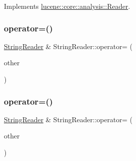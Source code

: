 Implements \mbox{\hyperlink{classlucene_1_1core_1_1analysis_1_1Reader_a230fae02ca4a63de33fdaad6f9aafd96}{lucene\+::core\+::analysis\+::\+Reader}}.

\mbox{\label{classlucene_1_1core_1_1analysis_1_1StringReader_ae79c2f5548c96bd451ebcb5a4f34ef0c}} 
\subsubsection{\texorpdfstring{operator=()}{operator=()}\hspace{0.1cm}{\footnotesize\ttfamily [1/4]}}
{\footnotesize\ttfamily \mbox{\hyperlink{classlucene_1_1core_1_1analysis_1_1StringReader}{String\+Reader}} \& String\+Reader\+::operator= (\begin{DoxyParamCaption}\item[{\mbox{\hyperlink{ZlibCrc32_8h_a2c212835823e3c54a8ab6d95c652660e}{const}} \mbox{\hyperlink{classlucene_1_1core_1_1analysis_1_1StringReader}{String\+Reader}} \&}]{other }\end{DoxyParamCaption})}

\mbox{\label{classlucene_1_1core_1_1analysis_1_1StringReader_a4ee9a9d9f36760e7d7a3495cb73efc70}} 
\subsubsection{\texorpdfstring{operator=()}{operator=()}\hspace{0.1cm}{\footnotesize\ttfamily [2/4]}}
{\footnotesize\ttfamily \mbox{\hyperlink{classlucene_1_1core_1_1analysis_1_1StringReader}{String\+Reader}} \& String\+Reader\+::operator= (\begin{DoxyParamCaption}\item[{\mbox{\hyperlink{classlucene_1_1core_1_1analysis_1_1StringReader}{String\+Reader}} \&\&}]{other }\end{DoxyParamCaption})}

